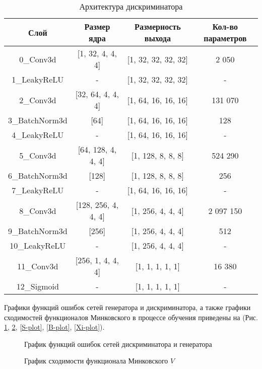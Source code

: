 		\begin{table}[h]
			\tabcolsep=0.11cm
			\centering
			\begin{tabular}{|c|c|c|c|}
				\hline
				Слой & Размер ядра & Размерность выхода & Кол-во параметров \\
				\hline
				0\_Conv3d &  [1, 32, 4, 4, 4] & [1, 32, 32, 32, 32] & 2 050 \\
				1\_LeakyReLU & - & [1, 32, 32, 32, 32] & - \\
				\hline
				2\_Conv3d &  [32, 64, 4, 4, 4] & [1, 64, 16, 16, 16] & 131 070 \\
				3\_BatchNorm3d &  [64] & [1, 64, 16, 16, 16] & 128 \\
				4\_LeakyReLU & - & [1, 64, 16, 16, 16] & - \\
				\hline
				5\_Conv3d &  [64, 128, 4, 4, 4] & [1, 128, 8, 8, 8] & 524 290 \\
				6\_BatchNorm3d &  [128] & [1, 128, 8, 8, 8] & 256 \\
				7\_LeakyReLU & - & [1, 64, 16, 16, 16] & - \\
				\hline
				8\_Conv3d &  [128, 256, 4, 4, 4] & [1, 256, 4, 4, 4] & 2 097 150 \\
				9\_BatchNorm3d &  [256] & [1, 256, 4, 4, 4] & 512 \\
				10\_LeakyReLU & - & [1, 256, 4, 4, 4] & - \\
				\hline
				11\_Conv3d &  [256, 1, 4, 4, 4] & [1, 1, 1, 1, 1] & 16 380 \\
				12\_Sigmoid & - & [1, 1, 1, 1, 1] & - \\
				\hline
			\end{tabular}
			\caption{Архитектура дискриминатора}
			\label{5-d-arch}
		\end{table}
		
		Графики функций ошибок сетей генератора и дискриминатора, а также графики сходимостей функционалов Минковского в процессе обучения приведены на (Рис. \ref{loss-plot}, \ref{V-plot}, \ref{S-plot}, \ref{B-plot}, \ref{Xi-plot}).
		
		\begin{figure}[h]
			\caption{График функций ошибок сетей дискриминатора и генератора}
			\label{loss-plot}
		\end{figure}
	
		\begin{figure}[h]
			\caption{График сходимости функционала Минковского $V$}
			\label{V-plot}
		\end{figure}
		

